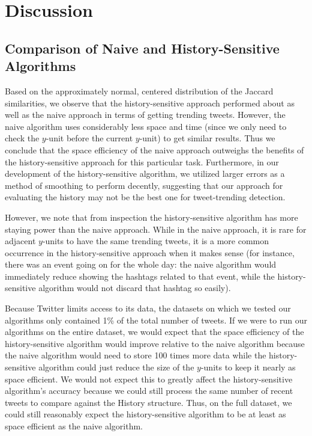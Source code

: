 \documentclass[twoside]{article}
\begin{document}
{%

\section{Discussion}

\subsection{Comparison of Naive and History-Sensitive Algorithms}

Based on the approximately normal, centered distribution of the Jaccard similarities, we observe that the history-sensitive approach performed about as well as the naive approach in terms of getting trending tweets. However, the naive algorithm uses considerably less space and time (since we only need to check the 
$y$-unit before the current $y$-unit) to get similar results. Thus we conclude that the space efficiency of the naive approach outweighs the benefits of the history-sensitive approach for this particular task.  Furthermore, in our development of the history-sensitive algorithm, we utilized larger errors as a method of smoothing to perform decently, suggesting that our approach for evaluating the history may not be the best one for tweet-trending detection. 

However, we note that from inspection the history-sensitive algorithm has more staying power than 
the naive approach. While in the naive approach, it is rare for adjacent $y$-units to have the same
trending tweets, it is a more common occurrence in the history-sensitive approach when it makes sense (for instance, there was an event going on for the whole day: the naive algorithm would immediately reduce showing the hashtags related to that event, while the history-sensitive algorithm would not discard that
hashtag so easily).

Because Twitter limits access to its data, the datasets on which we tested our algorithms only contained 1\% of the total number of tweets.  If we were to run our algorithms on the entire dataset, we would expect that the space efficiency of the history-sensitive algorithm would improve relative to the naive algorithm because the naive algorithm would need to store 100 times more data while the history-sensitive algorithm could just reduce the size of the $y$-units to keep it nearly as space efficient.  We would not expect this to greatly affect the history-sensitive algorithm's accuracy because we could still process the same number of recent tweets to compare against the History structure.  Thus, on the full dataset, we could still reasonably expect the history-sensitive algorithm to be at least as space efficient as the naive algorithm.

}
\end{document}
